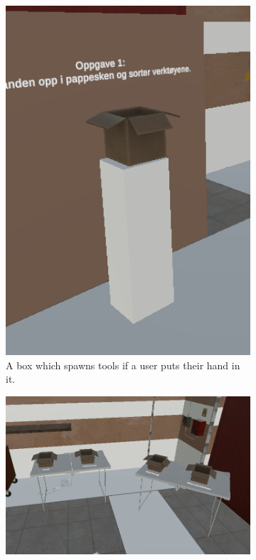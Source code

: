 \begin{figure}[]
  \centering
  \begin{subfigure}[b]{0.293\textwidth}
    \includegraphics[width=1\textwidth]{fig/phase_1/phase1Task1-1.PNG}
    \caption{A box which spawns tools if a user puts their hand in it.}
    \label{fig:task2Spawner}
  \end{subfigure}
    \hfill%
  \begin{subfigure}[b]{0.65\textwidth}
    \includegraphics[width=1\textwidth]{fig/phase_1/phase1Task1-2.PNG}

\end{subfigure}
\end{figure}

